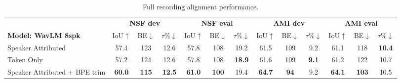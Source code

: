 \begin{table}[!th]
\centering
\caption{Full recording alignment performance.}
\label{tab:longform_ami}
\setlength{\tabcolsep}{2.4 pt}
\renewcommand{\arraystretch}{0.92}

\begin{tabular}{@{}l|ccc|ccc|ccc|ccc@{}}
\toprule
& \multicolumn{3}{c|}{\textbf{NSF dev}}
& \multicolumn{3}{c|}{\textbf{NSF eval}}
& \multicolumn{3}{c|}{\textbf{AMI dev}}
& \multicolumn{3}{c}{\textbf{AMI eval}} \\
\cmidrule(lr){2-4}
\cmidrule(lr){5-7}
\cmidrule(lr){8-10}
\cmidrule(l){11-13}

\textbf{Model: WavLM 8spk}
& IoU$\uparrow$ & BE$\downarrow$ & $\tau$\%$\downarrow$
& IoU$\uparrow$ & BE$\downarrow$ & $\tau$\%$\downarrow$
& IoU$\uparrow$ & BE$\downarrow$ & $\tau$\%$\downarrow$
& IoU$\uparrow$ & BE$\downarrow$ & $\tau$\%$\downarrow$ \\
\midrule

Speaker Attributed
& \cellcolor{cgood}57.4
& \cellcolor{cgood}123
& \cellcolor{cmed}12.6
& \cellcolor{cmed}57.8
& \cellcolor{cmed}108
& \cellcolor{cgood}19.2
& \cellcolor{cmed}61.5
& \cellcolor{cmed}109
& \cellcolor{cmed}9.2
& \cellcolor{cmed}61.1
& \cellcolor{cgood}118
& \cellcolor{cbest}\textbf{10.4} \\

Token Only
& \cellcolor{cmed}57.2
& \cellcolor{cmed}124
& \cellcolor{cmed}12.6
& \cellcolor{cmed}57.8
& \cellcolor{cmed}108
& \cellcolor{cbest}\textbf{18.9}
& \cellcolor{cgood}61.6
& \cellcolor{cmed}109
& \cellcolor{cbest}\textbf{9.1}
& \cellcolor{cgood}61.2
& \cellcolor{cmed}122
& \cellcolor{cmed}10.7 \\

Speaker Attributed + BPE trim
& \cellcolor{cbest}\textbf{60.0}
& \cellcolor{cbest}\textbf{115}
& \cellcolor{cbest}\textbf{12.5}
& \cellcolor{cbest}\textbf{61.0}
& \cellcolor{cbest}\textbf{100}
& \cellcolor{cmed}19.4
& \cellcolor{cbest}\textbf{64.7}
& \cellcolor{cbest}\textbf{94}
& \cellcolor{cmed}9.2
& \cellcolor{cbest}\textbf{64.1}
& \cellcolor{cbest}\textbf{103}
& \cellcolor{cgood}10.5 \\

\bottomrule
\end{tabular}%
\end{table}
\vspace{-8pt}